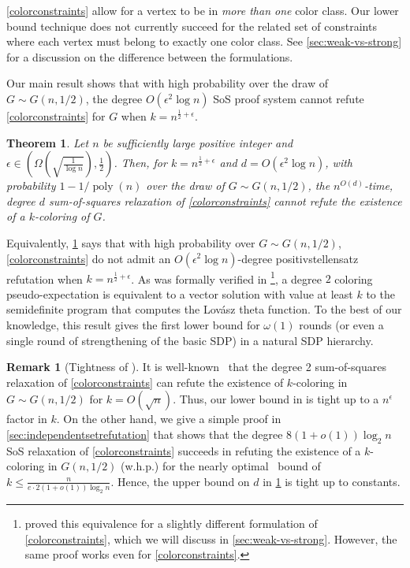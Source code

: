 \documentclass[10pt,a4paper]{article}
\newtheorem{mtheorem}{Theorem}
\theoremstyle{definition}
\newtheorem{remark}[theorem]{Remark}
\DeclareMathOperator{\poly}{poly}
\newcommand{\Lovasz}{Lov\'asz\xspace}
\newcommand{\eps}{\epsilon}
\begin{document}
\cref{colorconstraints} allow for a vertex to be in \emph{more than one} color class. Our lower bound technique does not currently succeed for the related set of constraints where each vertex must belong to exactly one color class. See \cref{sec:weak-vs-strong} for a discussion on the difference between the formulations.

Our main result shows that with high probability over the draw of $G \sim G(n,1/2)$, the degree $O(\eps^2 \log n)$ SoS proof system cannot refute \cref{colorconstraints} for $G$ when $k = n^{\frac{1}{2} + \eps}$. 


\begin{mtheorem}
\label{thm:coloringlb}
Let $n$ be sufficiently large positive integer and $\eps \in (\Omega(\sqrt{\frac{1}{\log n}}), \frac{1}{2})$. Then, for $k = n^{\frac{1}{2} + \eps}$ and $d = O(\eps^2 \log n)$, with probability $1 - 1/\poly(n)$ over the draw of $G \sim G(n,1/2)$, the $n^{O(d)}$-time, degree $d$ sum-of-squares relaxation of \cref{colorconstraints} cannot refute the existence of a $k$-coloring of $G$. 
\end{mtheorem}

Equivalently, \cref{thm:coloringlb} says that with high probability over $G \sim G(n,1/2)$, \cref{colorconstraints} do not admit an $O(\eps^2 \log n)$-degree positivstellensatz refutation when $k = n^{\frac{1}{2}+\eps}$. As was formally verified in \cite{DBLP:journals/siamcomp/BanksKM19}\footnote{\cite{DBLP:journals/siamcomp/BanksKM19} proved this equivalence for a slightly different formulation of \cref{colorconstraints}, which we will discuss in \cref{sec:weak-vs-strong}. However, the same proof works even for \cref{colorconstraints}.}, a degree $2$ coloring pseudo-expectation is equivalent to a vector solution with value at least $k$ to the semidefinite program that computes the \Lovasz theta function. To the best of our knowledge, this result gives the first lower bound for $\omega(1)$ rounds (or even a single round of strengthening of the basic SDP) in a natural SDP hierarchy.
 
\begin{remark}[Tightness of ] It is well-known~\cite{DBLP:journals/cpc/Coja-Oghlan05,DBLP:conf/approx/BanksKM17} that the degree 2 sum-of-squares relaxation of \cref{colorconstraints} can refute the existence of $k$-coloring in $G \sim G(n,1/2)$ for $k = O(\sqrt{n})$. Thus, our lower bound in  is tight up to a $n^{\eps}$ factor in $k$. On the other hand, we give a simple proof in \cref{sec:independentsetrefutation} that shows that the degree $8(1 + o(1)) \log_2 n$ SoS relaxation of \cref{colorconstraints} succeeds in refuting the existence of a $k$-coloring in $G(n,1/2)$ (w.h.p.) for the nearly optimal~\cite{MR951992} bound of $k \leq \frac{n}{e \cdot 2(1 + o(1))\log_2 n}$. Hence, the upper bound on $d$ in \cref{thm:coloringlb} is tight up to constants.
\end{remark}
\end{document}
